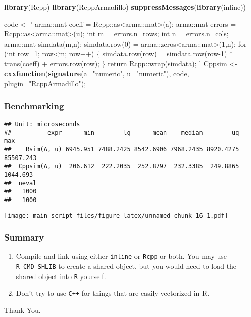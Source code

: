 \documentclass[]{article}
\newenvironment{Shaded}{\begin{snugshade}}{\end{snugshade}}
\newcommand{\KeywordTok}[1]{\textcolor[rgb]{0.13,0.29,0.53}{\textbf{#1}}}
\newcommand{\DataTypeTok}[1]{\textcolor[rgb]{0.13,0.29,0.53}{#1}}
\newcommand{\StringTok}[1]{\textcolor[rgb]{0.31,0.60,0.02}{#1}}
\newcommand{\NormalTok}[1]{#1}
\begin{document}
\begin{Shaded}
\begin{Highlighting}[]
\KeywordTok{library}\NormalTok{(Rcpp)}
\KeywordTok{library}\NormalTok{(RcppArmadillo)}
\KeywordTok{suppressMessages}\NormalTok{(}\KeywordTok{library}\NormalTok{(inline))}

\NormalTok{code <-}\StringTok{ '}
\StringTok{  arma::mat coeff = Rcpp::as<arma::mat>(a);}
\StringTok{  arma::mat errors = Rcpp::as<arma::mat>(u);}
\StringTok{  int m = errors.n_rows;}
\StringTok{  int n = errors.n_cols;}
\StringTok{  arma::mat simdata(m,n);}
\StringTok{  simdata.row(0) = arma::zeros<arma::mat>(1,n);}
\StringTok{  for (int row=1; row<m; row++) \{}
\StringTok{    simdata.row(row) = simdata.row(row-1) * trans(coeff) + errors.row(row);}
\StringTok{  \}}
\StringTok{  return Rcpp::wrap(simdata);}
\StringTok{'}
\NormalTok{Cppsim <-}\StringTok{ }\KeywordTok{cxxfunction}\NormalTok{(}\KeywordTok{signature}\NormalTok{(}\DataTypeTok{a=}\StringTok{"numeric"}\NormalTok{, }\DataTypeTok{u=}\StringTok{"numeric"}\NormalTok{), code, }\DataTypeTok{plugin=}\StringTok{"RcppArmadillo"}\NormalTok{);}
\end{Highlighting}
\end{Shaded}

\newpage

\subsubsection{Benchmarking}\label{benchmarking-3}

\begin{verbatim}
## Unit: microseconds
##          expr      min        lq      mean    median        uq       max
##    Rsim(A, u) 6945.951 7488.2425 8542.6906 7968.2435 8920.4275 85507.243
##  Cppsim(A, u)  206.612  222.2035  252.8797  232.3385  249.8865  1044.693
##  neval
##   1000
##   1000
\end{verbatim}

\texttt{[image: main\_script\_files/figure-latex/unnamed-chunk-16-1.pdf]}

\newpage

\subsubsection{Summary}\label{summary}

\begin{enumerate}
\def\labelenumi{\arabic{enumi}.}
\item
  Compile and link using either \texttt{inline} or \texttt{Rcpp} or
  both. You may use \texttt{R\ CMD\ SHLIB} to create a shared object,
  but you would need to load the shared object into \texttt{R} yourself.
\item
  Don't try to use \texttt{C++} for things that are easily vectorized in
  R.
\end{enumerate}

\newpage

\begin{center}
\LARGE
Thank You.
\end{center}
\end{document}
